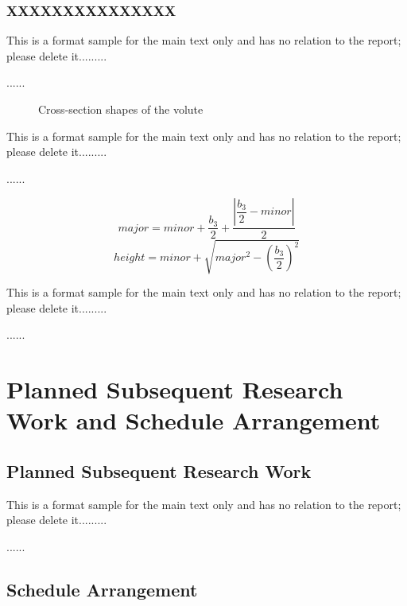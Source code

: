 \hitenter

\subsubsection{XXXXXXXXXXXXXXX}

This is a format sample for the main text only and has no relation to the report; please delete it.........

......

\begin{figure}[!ht]
  \centering
  \resizebox{14.64cm}{!}{}
  \caption{Cross-section shapes of the volute}
  \label{fig:szb-en-1}
\end{figure}

This is a format sample for the main text only and has no relation to the report; please delete it.........

......

\begin{equation}
  \mathit{major} = \mathit{minor} + \frac{b_3}{2} + \frac{\left| \dfrac{b_3}{2} - \mathit{minor} \right|}{2}
\end{equation}
\begin{equation}
  \mathit{height} = \mathit{minor} + \sqrt{\mathit{major}^2 - \left(\frac{b_3}{2}\right)^2}
\end{equation}

This is a format sample for the main text only and has no relation to the report; please delete it.........

......

\section{Planned Subsequent Research Work and Schedule Arrangement}

\subsection{Planned Subsequent Research Work}

This is a format sample for the main text only and has no relation to the report; please delete it.........

......

\subsection{Schedule Arrangement}


